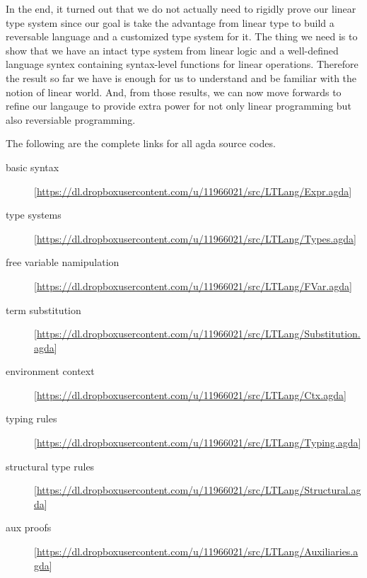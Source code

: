 \documentclass[a4paper,twocolumn]{article}
\begin{document}
In the end, it turned out that we do not actually need to rigidly prove our linear type system since our goal is take the advantage from linear type to build a reversable language and a customized type system for it. The thing we need is to show that we have an intact type system from linear logic and a well-defined language syntex containing syntax-level functions for linear operations. Therefore the result so far we have is enough for us to understand and be familiar with the notion of linear world. And, from those results, we can now move forwards to refine our langauge to provide extra power for not only linear programming but also reversiable programming.


The following are the complete links for all agda source codes.
\begin{description}
\item[basic syntax]{ [\url{https://dl.dropboxusercontent.com/u/11966021/src/LTLang/Expr.agda}]}
\item[type systems]{ [\url{https://dl.dropboxusercontent.com/u/11966021/src/LTLang/Types.agda}]}
\item[free variable namipulation]{ [\url{https://dl.dropboxusercontent.com/u/11966021/src/LTLang/FVar.agda}]}
\item[term substitution]{ [\url{https://dl.dropboxusercontent.com/u/11966021/src/LTLang/Substitution.agda}]}
\item[environment context]{ [\url{https://dl.dropboxusercontent.com/u/11966021/src/LTLang/Ctx.agda}]}
\item[typing rules]{ [\url{https://dl.dropboxusercontent.com/u/11966021/src/LTLang/Typing.agda}]}
\item[structural type rules]{ [\url{https://dl.dropboxusercontent.com/u/11966021/src/LTLang/Structural.agda}]}
\item[aux proofs]{ [\url{https://dl.dropboxusercontent.com/u/11966021/src/LTLang/Auxiliaries.agda}]}
\end{description}



\end{document}
